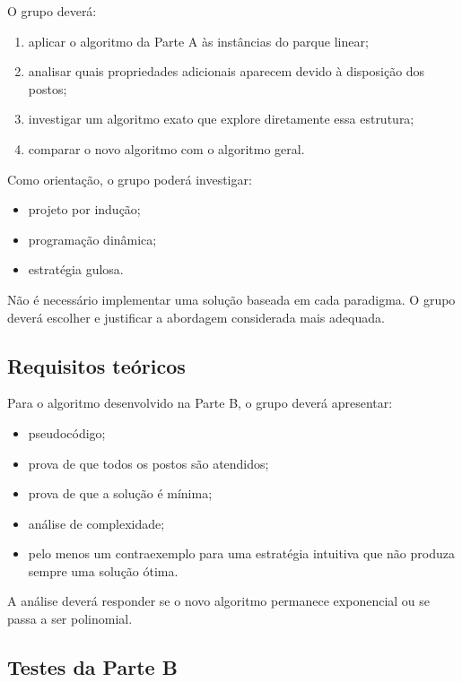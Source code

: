 \documentclass[11pt,a4paper]{article}
\begin{document}
O grupo deverá:

\begin{enumerate}
    \item aplicar o algoritmo da Parte A às instâncias do parque linear;
    \item analisar quais propriedades adicionais aparecem devido à disposição dos postos;
    \item investigar um algoritmo exato que explore diretamente essa estrutura;
    \item comparar o novo algoritmo com o algoritmo geral.
\end{enumerate}

Como orientação, o grupo poderá investigar:

\begin{itemize}
    \item projeto por indução;
    \item programação dinâmica;
    \item estratégia gulosa.
\end{itemize}

Não é necessário implementar uma solução baseada em cada paradigma. O grupo deverá escolher e justificar a abordagem considerada mais adequada.

\subsection{Requisitos teóricos}

Para o algoritmo desenvolvido na Parte B, o grupo deverá apresentar:

\begin{itemize}
    \item pseudocódigo;
    \item prova de que todos os postos são atendidos;
    \item prova de que a solução é mínima;
    \item análise de complexidade;
    \item pelo menos um contraexemplo para uma estratégia intuitiva que não produza sempre uma solução ótima.
\end{itemize}

A análise deverá responder se o novo algoritmo permanece exponencial ou se passa a ser polinomial.

\subsection{Testes da Parte B}
\end{document}
